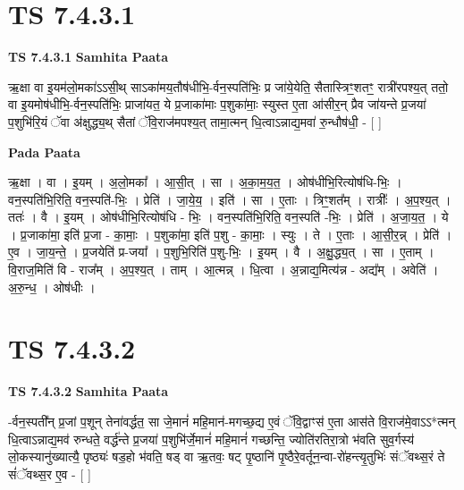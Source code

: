 \documentclass[17pt]{extarticle}
\begin{document}
\section*{ TS 7.4.3.1 }

\textbf{TS 7.4.3.1 } \newline
\textbf{Samhita Paata} \newline

ऋ॒क्षा वा इ॒यम॑लो॒मका॑ऽऽसी॒थ् साऽका॑मय॒तौष॑धीभि॒-र्वन॒स्पति॑भिः॒ प्र जा॑ये॒येति॒ सैतास्त्रिꣳ॒॒शतꣳ॒॒ रात्री॑रपश्य॒त् ततो॒ वा इ॒यमोष॑धीभि॒-र्वन॒स्पति॑भिः॒ प्राजा॑यत॒ ये प्र॒जाका॑माः प॒शुका॑माः॒ स्युस्त ए॒ता आ॑सीर॒न् प्रैव जा॑यन्ते प्र॒जया॑ प॒शुभि॑रि॒यं ॅवा अ॑क्षुद्ध्य॒थ् सैतां ॅवि॒राज॑मपश्य॒त् तामा॒त्मन् धि॒त्वाऽन्नाद्य॒मवा॑ रु॒न्धौष॑धी॒ - [  ] \newline

\textbf{Pada Paata} \newline

ऋ॒क्षा । वा । इ॒यम् । अ॒लो॒मका᳚ । आ॒सी॒त् । सा । अ॒का॒म॒य॒त॒ । ओष॑धीभि॒रित्योष॑धि-भिः॒ । वन॒स्पति॑भि॒रिति॒ वन॒स्पति॑-भिः॒ । प्रेति॑ । जा॒ये॒य॒ । इति॑ । सा । ए॒ताः । त्रिꣳ॒॒शत᳚म् । रात्रीः᳚ । अ॒प॒श्य॒त् । ततः॑ । वै । इ॒यम् । ओष॑धीभि॒रित्योष॑धि - भिः॒ । वन॒स्पति॑भि॒रिति॒ वन॒स्पति॑ -भिः॒ । प्रेति॑ । अ॒जा॒य॒त॒ । ये । प्र॒जाका॑मा॒ इति॑ प्र॒जा - का॒माः॒ । प॒शुका॑मा॒ इति॑ प॒शु - का॒माः॒ । स्युः । ते । ए॒ताः । आ॒सी॒र॒न्न् । प्रेति॑ । ए॒व । जा॒य॒न्ते॒ । प्र॒जयेति॑ प्र-जया᳚ । प॒शुभि॒रिति॑ प॒शु-भिः॒ । इ॒यम् । वै । अ॒क्षु॒द्ध्य॒त् । सा । ए॒ताम् । वि॒राज॒मिति॑ वि - राज᳚म् । अ॒प॒श्य॒त् । ताम् । आ॒त्मन्न् । धि॒त्वा । अ॒न्नाद्य॒मित्य॑न्न - अद्य᳚म् । अवेति॑ । अ॒रु॒न्ध॒ । ओष॑धीः ।  \newline




\section*{ TS 7.4.3.2 }

\textbf{TS 7.4.3.2 } \newline
\textbf{Samhita Paata} \newline

-र्वन॒स्पती᳚न् प्र॒जां प॒शून् तेना॑वर्द्धत॒ सा जे॒मानं॑ महि॒मान॑-मगच्छ॒द्य ए॒वं ॅवि॒द्वाꣳस॑ ए॒ता आस॑ते वि॒राज॑मे॒वाऽऽ*त्मन् धि॒त्वाऽन्नाद्य॒मव॑ रुन्धते॒ वर्द्ध॑न्ते प्र॒जया॑ प॒शुभि॑र्जे॒मानं॑ महि॒मानं॑ गच्छन्ति॒ ज्योति॑रतिरा॒त्रो भ॑वति सुव॒र्गस्य॑ लो॒कस्यानु॑ख्यात्यै॒ पृष्ठ्यः॑ षड॒हो भ॑वति॒ षड् वा ऋ॒तवः॒ षट् पृ॒ष्ठानि॑ पृ॒ष्ठैरे॒वर्तून॒न्वा-रो॑हन्त्यृ॒तुभिः॑ संॅवथ्स॒रं ते सं॑ॅवथ्स॒र ए॒व - [  ] \newline
\end{document}
